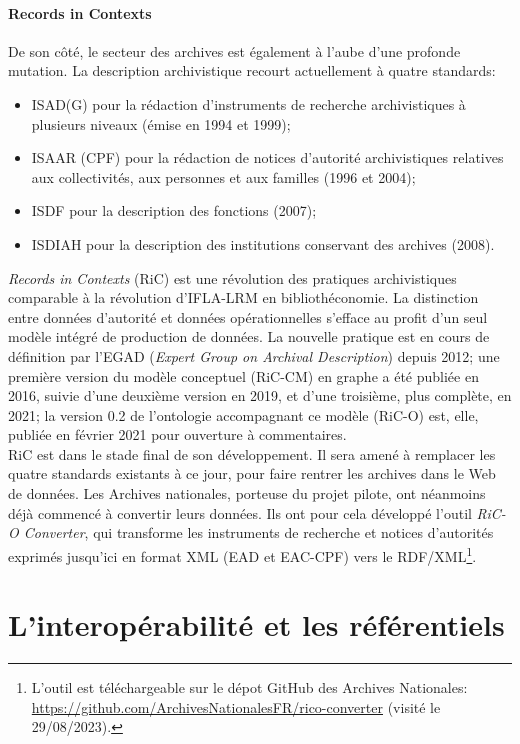 \documentclass[a4paper,12pt,twoside]{book}
\begin{document}
\subsubsection{Records in Contexts}
De son côté, le secteur des archives est également à l'aube d'une profonde mutation. La description archivistique recourt actuellement à quatre standards: 
\begin{itemize}
    \item ISAD(G) pour la rédaction d'instruments de recherche archivistiques à plusieurs niveaux (émise en 1994 et 1999);
    \item ISAAR (CPF) pour la rédaction de notices d'autorité archivistiques relatives aux collectivités, aux personnes et aux familles (1996 et 2004);
    \item ISDF pour la description des fonctions (2007);
    \item ISDIAH pour la description des institutions conservant des archives (2008).
\end{itemize}

\textit{Records in Contexts} (RiC) est une révolution des pratiques archivistiques comparable à la révolution d'IFLA-LRM en bibliothéconomie. La distinction entre données d'autorité et données opérationnelles s'efface au profit d'un seul modèle intégré de production de données. La nouvelle pratique est en cours de définition par l'EGAD (\textit{Expert Group on Archival Description}) depuis 2012; une première version du modèle conceptuel (RiC-CM) en graphe a été publiée en 2016, suivie d'une deuxième version en 2019, et d'une troisième, plus complète, en 2021; la version 0.2 de l'ontologie accompagnant ce modèle (RiC-O) est, elle, publiée en février 2021 pour ouverture à commentaires.\\

RiC est dans le stade final de son développement. Il sera amené à remplacer les quatre standards existants à ce jour, pour faire rentrer les archives dans le Web de données. Les Archives nationales, porteuse du projet pilote, ont néanmoins déjà commencé à convertir leurs données. Ils ont pour cela développé l'outil \textit{RiC-O Converter}, qui transforme les instruments de recherche et notices d'autorités exprimés jusqu'ici en format XML (EAD et EAC-CPF) vers le RDF/XML\footnote{L'outil est téléchargeable sur le dépot GitHub des Archives Nationales: \url{https://github.com/ArchivesNationalesFR/rico-converter} (visité le 29/08/2023).}.  

 
 \chapter{L'interopérabilité et les référentiels}
\end{document}
